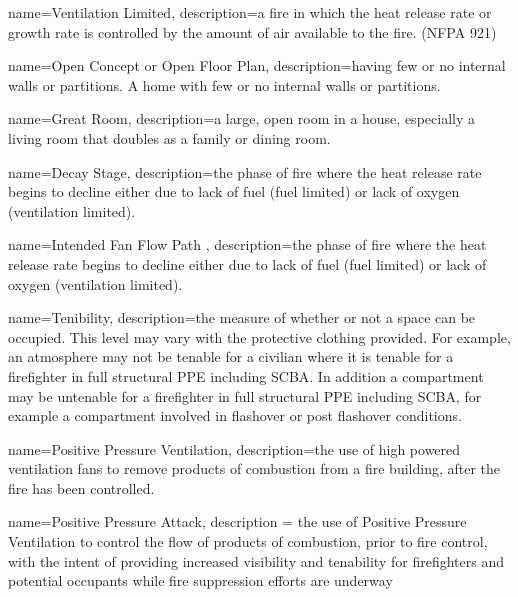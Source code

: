 {
	name=Ventilation Limited,
	description={a fire in which the heat release rate or growth rate is controlled by the amount of air available to the fire. (NFPA 921)}
}

{
	name=Open Concept or Open Floor Plan,
	description={having few or no internal walls or partitions. A home with few or no internal walls or partitions.}
}

{
	name=Great Room,
	description={a large, open room in a house, especially a living room that doubles as a family or dining room.}
}

{
	name=Decay Stage,
	description={the phase of fire where the heat release rate begins to decline either due to lack of fuel (fuel limited) or lack of oxygen (ventilation limited).}
}

{
	name=Intended Fan Flow Path ,
	description={the phase of fire where the heat release rate begins to decline either due to lack of fuel (fuel limited) or lack of oxygen (ventilation limited).}
}

{
	name=Tenibility,
	description={the measure of whether or not a space can be occupied. This level may vary with the protective clothing provided. For example, an atmosphere may not be tenable for a civilian where it is tenable for a firefighter in full structural PPE including SCBA. In addition a compartment may be untenable for a firefighter in full structural PPE including SCBA, for example a compartment involved in flashover or post flashover conditions. }
}


{
	name={Positive Pressure Ventilation},
	description={the use of high powered ventilation fans to remove products of combustion from a fire building, after the fire has been controlled.}
}

{
	name={Positive Pressure Attack},
	description = {the use of Positive Pressure Ventilation to control the flow of products of combustion, prior to fire control, with the intent of providing increased visibility and tenability for firefighters and potential occupants while fire suppression efforts are underway}
}